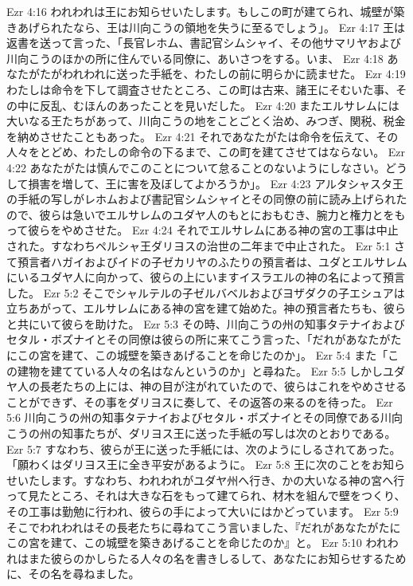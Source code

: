 Ezr 4:16  われわれは王にお知らせいたします。もしこの町が建てられ、城壁が築きあげられたなら、王は川向こうの領地を失うに至るでしょう」。
Ezr 4:17  王は返書を送って言った、「長官レホム、書記官シムシャイ、その他サマリヤおよび川向こうのほかの所に住んでいる同僚に、あいさつをする。いま、
Ezr 4:18  あなたがたがわれわれに送った手紙を、わたしの前に明らかに読ませた。
Ezr 4:19  わたしは命令を下して調査させたところ、この町は古来、諸王にそむいた事、その中に反乱、むほんのあったことを見いだした。
Ezr 4:20  またエルサレムには大いなる王たちがあって、川向こうの地をことごとく治め、みつぎ、関税、税金を納めさせたこともあった。
Ezr 4:21  それであなたがたは命令を伝えて、その人々をとどめ、わたしの命令の下るまで、この町を建てさせてはならない。
Ezr 4:22  あなたがたは慎んでこのことについて怠ることのないようにしなさい。どうして損害を増して、王に害を及ぼしてよかろうか」。
Ezr 4:23  アルタシャスタ王の手紙の写しがレホムおよび書記官シムシャイとその同僚の前に読み上げられたので、彼らは急いでエルサレムのユダヤ人のもとにおもむき、腕力と権力とをもって彼らをやめさせた。
Ezr 4:24  それでエルサレムにある神の宮の工事は中止された。すなわちペルシャ王ダリヨスの治世の二年まで中止された。
Ezr 5:1  さて預言者ハガイおよびイドの子ゼカリヤのふたりの預言者は、ユダとエルサレムにいるユダヤ人に向かって、彼らの上にいますイスラエルの神の名によって預言した。
Ezr 5:2  そこでシャルテルの子ゼルバベルおよびヨザダクの子エシュアは立ちあがって、エルサレムにある神の宮を建て始めた。神の預言者たちも、彼らと共にいて彼らを助けた。
Ezr 5:3  その時、川向こうの州の知事タテナイおよびセタル・ボズナイとその同僚は彼らの所に来てこう言った、「だれがあなたがたにこの宮を建て、この城壁を築きあげることを命じたのか」。
Ezr 5:4  また「この建物を建てている人々の名はなんというのか」と尋ねた。
Ezr 5:5  しかしユダヤ人の長老たちの上には、神の目が注がれていたので、彼らはこれをやめさせることができず、その事をダリヨスに奏して、その返答の来るのを待った。
Ezr 5:6  川向こうの州の知事タテナイおよびセタル・ボズナイとその同僚である川向こうの州の知事たちが、ダリヨス王に送った手紙の写しは次のとおりである。
Ezr 5:7  すなわち、彼らが王に送った手紙には、次のようにしるされてあった。「願わくはダリヨス王に全き平安があるように。
Ezr 5:8  王に次のことをお知らせいたします。すなわち、われわれがユダヤ州へ行き、かの大いなる神の宮へ行って見たところ、それは大きな石をもって建てられ、材木を組んで壁をつくり、その工事は勤勉に行われ、彼らの手によって大いにはかどっています。
Ezr 5:9  そこでわれわれはその長老たちに尋ねてこう言いました、『だれがあなたがたにこの宮を建て、この城壁を築きあげることを命じたのか』と。
Ezr 5:10  われわれはまた彼らのかしらたる人々の名を書きしるして、あなたにお知らせするために、その名を尋ねました。
